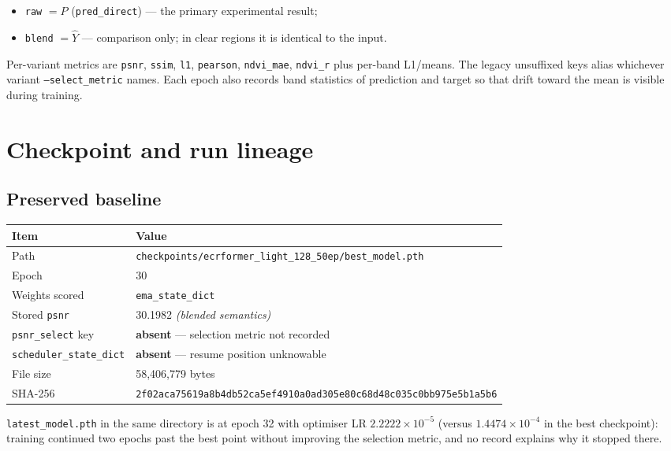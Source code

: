 \documentclass[10pt,a4paper]{article}
\newcommand{\code}[1]{\texttt{#1}}
\begin{document}
\begin{itemize}
\item \code{raw} $=P$ (\code{pred\_direct}) --- the primary experimental result;
\item \code{blend} $=\hat Y$ --- comparison only; in clear regions it is identical to the input.
\end{itemize}

Per-variant metrics are \code{psnr}, \code{ssim}, \code{l1}, \code{pearson}, \code{ndvi\_mae},
\code{ndvi\_r} plus per-band L1/means. The legacy unsuffixed keys alias whichever variant
\code{--select\_metric} names. Each epoch also records band statistics of prediction and target
so that drift toward the mean is visible during training.

\section{Checkpoint and run lineage}

\subsection{Preserved baseline}

\begin{center}
\begin{tabular}{@{}ll@{}}
\hline
Item & Value \\
\hline
Path & \code{checkpoints/ecrformer\_light\_128\_50ep/best\_model.pth} \\
Epoch & 30 \\
Weights scored & \code{ema\_state\_dict} \\
Stored \code{psnr} & 30.1982 \emph{(blended semantics)} \\
\code{psnr\_select} key & \textbf{absent} --- selection metric not recorded \\
\code{scheduler\_state\_dict} & \textbf{absent} --- resume position unknowable \\
File size & 58{,}406{,}779 bytes \\
SHA-256 & \code{2f02aca75619a8b4db52ca5ef4910a0ad305e80c68d48c035c0bb975e5b1a5b6} \\
\hline
\end{tabular}
\end{center}

\code{latest\_model.pth} in the same directory is at epoch 32 with optimiser LR
$2.2222\times10^{-5}$ (versus $1.4474\times10^{-4}$ in the best checkpoint): training continued two
epochs past the best point without improving the selection metric, and no record explains why it
stopped there.
\end{document}
